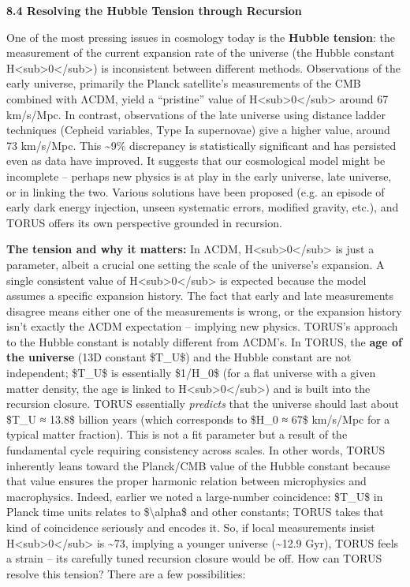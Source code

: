 \textbf{8.4 Resolving the Hubble Tension through Recursion}

One of the most pressing issues in cosmology today is the \textbf{Hubble
tension}: the measurement of the current expansion rate of the universe
(the Hubble constant
H\textless{}sub\textgreater{}0\textless{}/sub\textgreater{}) is
inconsistent between different methods. Observations of the early
universe, primarily the Planck satellite's measurements of the CMB
combined with ΛCDM, yield a ``pristine'' value of
H\textless{}sub\textgreater{}0\textless{}/sub\textgreater{} around 67
km/s/Mpc. In contrast, observations of the late universe using distance
ladder techniques (Cepheid variables, Type Ia supernovae) give a higher
value, around 73 km/s/Mpc. This \textasciitilde{}9\% discrepancy is
statistically significant and has persisted even as data have improved.
It suggests that our cosmological model might be incomplete -- perhaps
new physics is at play in the early universe, late universe, or in
linking the two. Various solutions have been proposed (e.g. an episode
of early dark energy injection, unseen systematic errors, modified
gravity, etc.), and TORUS offers its own perspective grounded in
recursion.

\textbf{The tension and why it matters:} In ΛCDM,
H\textless{}sub\textgreater{}0\textless{}/sub\textgreater{} is just a
parameter, albeit a crucial one setting the scale of the universe's
expansion. A single consistent value of
H\textless{}sub\textgreater{}0\textless{}/sub\textgreater{} is expected
because the model assumes a specific expansion history. The fact that
early and late measurements disagree means either one of the
measurements is wrong, or the expansion history isn't exactly the ΛCDM
expectation -- implying new physics. TORUS's approach to the Hubble
constant is notably different from ΛCDM's. In TORUS, the \textbf{age of
the universe} (13D constant \$T\_U\$) and the Hubble constant are not
independent; \$T\_U\$ is essentially \$1/H\_0\$ (for a flat universe
with a given matter density, the age is linked to
H\textless{}sub\textgreater{}0\textless{}/sub\textgreater{}) and is
built into the recursion closure. TORUS essentially \emph{predicts} that
the universe should last about \$T\_U ≈ 13.8\$ billion years (which
corresponds to \$H\_0 ≈ 67\$ km/s/Mpc for a typical matter fraction)​.
This is not a fit parameter but a result of the fundamental cycle
requiring consistency across scales. In other words, TORUS inherently
leans toward the Planck/CMB value of the Hubble constant because that
value ensures the proper harmonic relation between microphysics and
macrophysics. Indeed, earlier we noted a large-number coincidence:
\$T\_U\$ in Planck time units relates to \$\textbackslash{}alpha\$ and
other constants; TORUS takes that kind of coincidence seriously and
encodes it. So, if local measurements insist
H\textless{}sub\textgreater{}0\textless{}/sub\textgreater{} is
\textasciitilde{}73, implying a younger universe (\textasciitilde{}12.9
Gyr), TORUS feels a strain -- its carefully tuned recursion closure
would be off​. How can TORUS resolve this tension? There are a few
possibilities:

